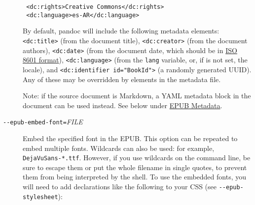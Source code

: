 \documentclass[]{article}
\begin{document}
\begin{description}
\begin{verbatim}
 <dc:rights>Creative Commons</dc:rights>
 <dc:language>es-AR</dc:language>
\end{verbatim}

By default, pandoc will include the following metadata elements:
\texttt{\textless{}dc:title\textgreater{}} (from the document title),
\texttt{\textless{}dc:creator\textgreater{}} (from the document
authors), \texttt{\textless{}dc:date\textgreater{}} (from the document
date, which should be in \href{http://www.w3.org/TR/NOTE-datetime}{ISO
8601 format}), \texttt{\textless{}dc:language\textgreater{}} (from the
\texttt{lang} variable, or, if is not set, the locale), and
\texttt{\textless{}dc:identifier\ id="BookId"\textgreater{}} (a randomly
generated UUID). Any of these may be overridden by elements in the
metadata file.

Note: if the source document is Markdown, a YAML metadata block in the
document can be used instead. See below under
\protect\hyperlink{epub-metadata}{EPUB Metadata}.
\item[\texttt{-\/-epub-embed-font=}\emph{FILE}]
Embed the specified font in the EPUB. This option can be repeated to
embed multiple fonts. Wildcards can also be used: for example,
\texttt{DejaVuSans-*.ttf}. However, if you use wildcards on the command
line, be sure to escape them or put the whole filename in single quotes,
to prevent them from being interpreted by the shell. To use the embedded
fonts, you will need to add declarations like the following to your CSS
(see \texttt{-\/-epub-stylesheet}):


\end{description}
\end{document}
